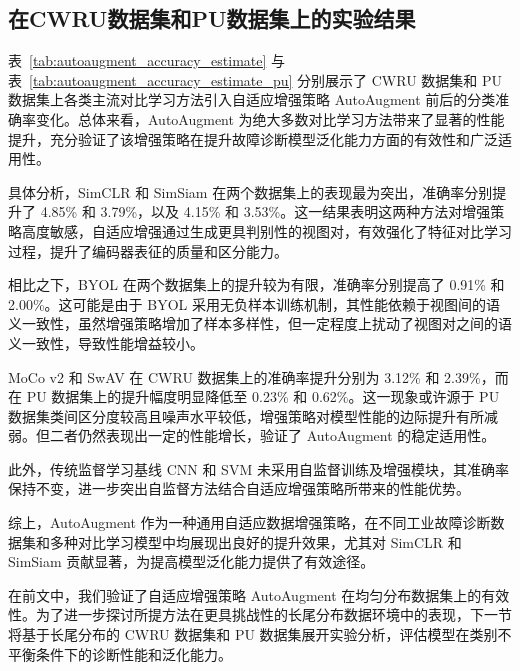 \documentclass[master]{thesis-uestc}
\begin{document}
\FloatBarrier  %

\subsection{在CWRU数据集和PU数据集上的实验结果}
表~\ref{tab:autoaugment_accuracy_estimate} 与表~\ref{tab:autoaugment_accuracy_estimate_pu} 分别展示了 CWRU 数据集和 PU 数据集上各类主流对比学习方法引入自适应增强策略 AutoAugment 前后的分类准确率变化。总体来看，AutoAugment 为绝大多数对比学习方法带来了显著的性能提升，充分验证了该增强策略在提升故障诊断模型泛化能力方面的有效性和广泛适用性。

具体分析，SimCLR 和 SimSiam 在两个数据集上的表现最为突出，准确率分别提升了 4.85\% 和 3.79\%，以及 4.15\% 和 3.53\%。这一结果表明这两种方法对增强策略高度敏感，自适应增强通过生成更具判别性的视图对，有效强化了特征对比学习过程，提升了编码器表征的质量和区分能力。

相比之下，BYOL 在两个数据集上的提升较为有限，准确率分别提高了 0.91\% 和 2.00\%。这可能是由于 BYOL 采用无负样本训练机制，其性能依赖于视图间的语义一致性，虽然增强策略增加了样本多样性，但一定程度上扰动了视图对之间的语义一致性，导致性能增益较小。

MoCo v2 和 SwAV 在 CWRU 数据集上的准确率提升分别为 3.12\% 和 2.39\%，而在 PU 数据集上的提升幅度明显降低至 0.23\% 和 0.62\%。这一现象或许源于 PU 数据集类间区分度较高且噪声水平较低，增强策略对模型性能的边际提升有所减弱。但二者仍然表现出一定的性能增长，验证了 AutoAugment 的稳定适用性。

此外，传统监督学习基线 CNN 和 SVM 未采用自监督训练及增强模块，其准确率保持不变，进一步突出自监督方法结合自适应增强策略所带来的性能优势。

综上，AutoAugment 作为一种通用自适应数据增强策略，在不同工业故障诊断数据集和多种对比学习模型中均展现出良好的提升效果，尤其对 SimCLR 和 SimSiam 贡献显著，为提高模型泛化能力提供了有效途径。

在前文中，我们验证了自适应增强策略 AutoAugment 在均匀分布数据集上的有效性。为了进一步探讨所提方法在更具挑战性的长尾分布数据环境中的表现，下一节将基于长尾分布的 CWRU 数据集和 PU 数据集展开实验分析，评估模型在类别不平衡条件下的诊断性能和泛化能力。
\end{document}
